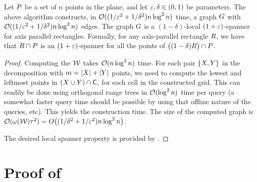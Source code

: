 \documentclass[12pt]{article}%
\begin{document}
\begin{theorem}
    Let $P$ be a set of $n$ points in the plane, and let
    $\varepsilon, \delta \in (0,1)$ be parameters. The above algorithm
    constructs, in $\mathcal{O}((1/\varepsilon^2 + 1/\delta^2) n \log^2 n)$ time, a
    graph $G$ with $\mathcal{O}((1/\varepsilon^2 + 1/\delta^2) n \log^2 n)$
    edges. The graph $G$ is a $(1-\delta)$-local $(1+\varepsilon)$-spanner
    for axis parallel rectangles. Formally, for any axis-parallel
    rectangle $R$, we have that $R \cap P$ is an
    $(1+\varepsilon)$-spanner for all the points of
    $\bigl((1-\delta)R \bigr)\cap P$.
\end{theorem}
\begin{proof}
    Computing the \QSPD $\mathcal{W}$ takes $\mathcal{O}(n \log^2 n)$ time. For each
    pair $\{X, Y\}$ in the decomposition with
    $m = |X| + |Y|$ points, we need to compute the lowest and
    leftmost points in $(X \cup Y) \cap \mathsf{C}$, for each cell in
    the constructed grid. This can readily be done using orthogonal
    range trees in $\mathcal{O}( \log^2 n)$ time per query (a somewhat faster
    query time should be possible by using that offline nature of the
    queries, etc). This yields the construction time. The size of the
    computed graph is
    $\Of(\WeightX{\WS} \gConst^2) = O\bigl((1/\delta^2 + 1/\eps^2) n
    \log^2 n\bigr)$.

    The desired local spanner property is provided by
    .
\end{proof}









% 


\appendix
\section{Proof of }

%
{%
   \LemmaRefineDWBody{}%
}
   
\end{document}
